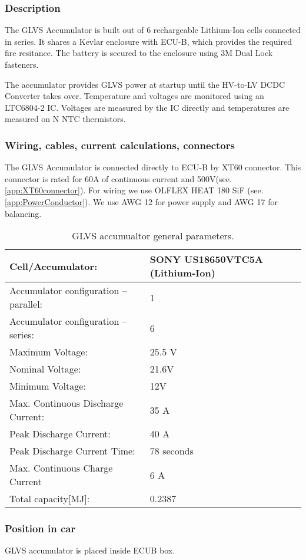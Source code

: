 \subsubsection{Description}

The GLVS Accumulator is built out of 6 rechargeable Lithium-Ion cells connected in series. It shares a Kevlar enclosure with ECU-B, which provides the required fire resitance. The battery is secured to the enclosure using 3M Dual Lock fasteners.

The accumulator provides GLVS power at startup until the HV-to-LV DCDC Converter takes over. Temperature and voltages are monitored using an LTC6804-2 IC. Voltages are measured by the IC directly and temperatures are measured on N NTC thermistors.

\subsubsection{Wiring, cables, current calculations, connectors}

The GLVS Accumulator is connected directly to ECU-B by XT60 connector. This connector is rated for 60A of continuous current and 500V(see. \ref{app:XT60connector}). For wiring we use OLFLEX HEAT 180 SiF (see. \ref{app:PowerConductor}). We use AWG 12 for power supply and AWG 17 for balancing.

\begin{table}[H]
	\centering
	\caption{GLVS accumualtor general parameters.}
	\begin{tabularx}{\textwidth}{|X|X|}\hline
		Cell/Accumulator: & SONY US18650VTC5A (Lithium-Ion)\\[\TableSize]\hline
		Accumulator configuration – parallel: & 1 \\[\TableSize]\hline
		Accumulator configuration – series: & 6 \\[\TableSize]\hline
		Maximum Voltage: & 25.5 V \\[\TableSize]\hline
		Nominal Voltage: & 21.6V \\[\TableSize]\hline
		Minimum Voltage: & 12V \\[\TableSize]\hline
		Max. Continuous Discharge Current: & 35 A \\[\TableSize]\hline
		Peak Discharge Current: & 40 A \\[\TableSize]\hline
		Peak Discharge Current Time: & 78 seconds \\[\TableSize]\hline
		Max. Continuous Charge Current & 6 A \\[\TableSize]\hline
		Total capacity[MJ]: & 0.2387 \\[\TableSize]\hline
	\end{tabularx}%
	\label{tab:LVbatt-general}%
\end{table}%

\subsubsection{Position in car}

GLVS accumulator is placed inside ECUB box.